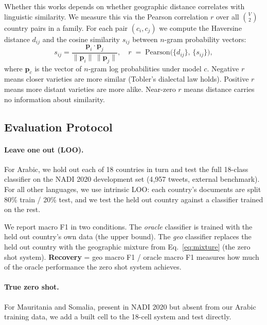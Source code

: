 \documentclass[11pt]{article}
\begin{document}
Whether this works depends on whether geographic distance correlates with linguistic similarity.
We measure this via the Pearson correlation $r$ over all $\binom{V}{2}$ country pairs in a family.
For each pair $(c_i, c_j)$ we compute the Haversine distance $d_{ij}$ and the cosine similarity $s_{ij}$ between $n$-gram probability vectors:
\begin{equation}
  s_{ij} = \frac{\mathbf{p}_i \cdot \mathbf{p}_j}
                {\|\mathbf{p}_i\|\,\|\mathbf{p}_j\|},\quad
  r \;=\; \mathrm{Pearson}\!\bigl(\{d_{ij}\},\, \{s_{ij}\}\bigr),
  \label{eq:corr}
\end{equation}
where $\mathbf{p}_c$ is the vector of $n$-gram log probabilities under model $c$.
Negative $r$ means closer varieties are more similar (Tobler's dialectal law holds).
Positive $r$ means more distant varieties are more alike.
Near-zero $r$ means distance carries no information about similarity.

\subsection{Evaluation Protocol}

\paragraph{Leave one out (LOO).}
For Arabic, we hold out each of 18 countries in turn and test the full 18-class classifier on the NADI 2020 development set (4{,}957 tweets, external benchmark).
For all other languages, we use intrinsic LOO: each country's documents are split 80\% train / 20\% test, and we test the held out country against a classifier trained on the rest.

We report macro F1 in two conditions.
The \emph{oracle} classifier is trained with the held out country's own data (the upper bound).
The \emph{geo} classifier replaces the held out country with the geographic mixture from Eq.~\ref{eq:mixture} (the zero shot system).
\textbf{Recovery} = geo macro F1 / oracle macro F1 measures how much of the oracle performance the zero shot system achieves.

\paragraph{True zero shot.}
For Mauritania and Somalia, present in NADI 2020 but absent from our Arabic training data, we add a built cell to the 18-cell system and test directly.
\end{document}
